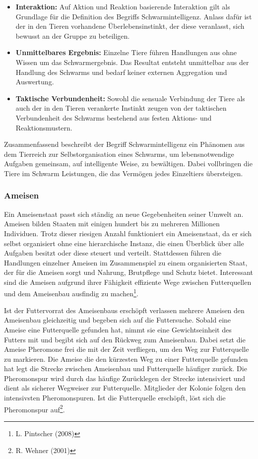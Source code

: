 \documentclass[a4paper, 11pt]{article}
\begin{document}
\begin{itemize}
	\item \textbf{Interaktion:} Auf Aktion und Reaktion basierende Interaktion gilt als Grundlage für die Definition des Begriffs Schwarmintelligenz. Anlass dafür ist der in den Tieren vorhandene Überlebensinstinkt, der diese veranlasst, sich bewusst an der Gruppe zu beteiligen.
	\item \textbf{Unmittelbares Ergebnis:} Einzelne Tiere führen Handlungen aus ohne Wissen um das Schwarmergebnis. Das Resultat entsteht unmittelbar aus der Handlung des Schwarms und bedarf keiner externen Aggregation und Auswertung.
	\item \textbf{Taktische Verbundenheit:} Sowohl die sensuale Verbindung der Tiere als auch der in den Tieren verankerte Instinkt zeugen von der taktischen Verbundenheit des Schwarms bestehend aus festen Aktions- und Reaktionsmustern. 
\end{itemize}
\par Zusammenfassend beschreibt der Begriff Schwarmintelligenz ein Phänomen aus dem Tierreich zur Selbstorganisation eines Schwarms, um lebensnotwendige Aufgaben gemeinsam, auf intelligente Weise, zu bewältigen. Dabei vollbringen die Tiere im Schwarm Leistungen, die das Vermögen jedes Einzeltiers übersteigen.
\subsubsection{Ameisen}
Ein Ameisenstaat passt sich ständig an neue Gegebenheiten seiner Umwelt an. Ameisen bilden Staaten mit einigen hundert bis zu mehreren Millionen Individuen. Trotz dieser riesigen Anzahl funktioniert ein Ameisenstaat, da er sich selbst organisiert ohne eine hierarchische Instanz, die einen Überblick über alle Aufgaben besitzt oder diese steuert und verteilt. Stattdessen führen die Handlungen einzelner Ameisen im Zusammenspiel zu einem organisierten Staat, der für die Ameisen sorgt und Nahrung, Brutpflege und Schutz bietet. Interessant sind die Ameisen aufgrund ihrer Fähigkeit effiziente Wege zwischen Futterquellen und dem Ameisenbau ausfindig zu machen\footnote{L. Pintscher (2008)}.
\par Ist der Futtervorrat des Ameisenbaus erschöpft verlassen mehrere Ameisen den Ameisenbau gleichzeitig und begeben sich auf die Futtersuche. Sobald eine Ameise eine Futterquelle gefunden hat, nimmt sie eine Gewichtseinheit des Futters mit und begibt sich auf den Rückweg zum Ameisenbau. Dabei setzt die Ameise Pheromone frei die mit der Zeit verfliegen, um den Weg zur Futterquelle zu markieren. Die Ameise die den kürzesten Weg zu einer Futterquelle gefunden hat legt die Strecke zwischen Ameisenbau und Futterquelle häufiger zurück.  Die Pheromonspur wird durch das häufige Zurücklegen der Strecke intensiviert und dient als sicherer Wegweiser zur Futterquelle. Mitglieder der Kolonie folgen den intensivsten Pheromonspuren. Ist die Futterquelle erschöpft, löst sich die Pheromonspur auf\footnote{R. Wehner (2001)}.
\end{document}
